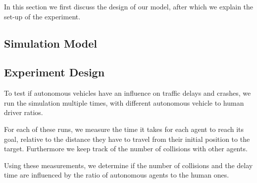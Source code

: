 In this section we first discuss the design of our model, after which we explain the set-up of the experiment.

\subsection{Simulation Model}
\label{sub:method:model}



\subsection{Experiment Design}
\label{sub:method:design}
To test if autonomous vehicles have an influence on traffic delays and crashes, we run the simulation multiple times, with different autonomous vehicle to human driver ratios.

For each of these runs, we measure the time it takes for each agent to reach its goal, relative to the distance they have to travel from their initial position to the target. Furthermore we keep track of the number of collisions with other agents. 

Using these measurements, we  determine if the number of collisions and the delay time are influenced by the ratio of autonomous agents to the human ones. 



